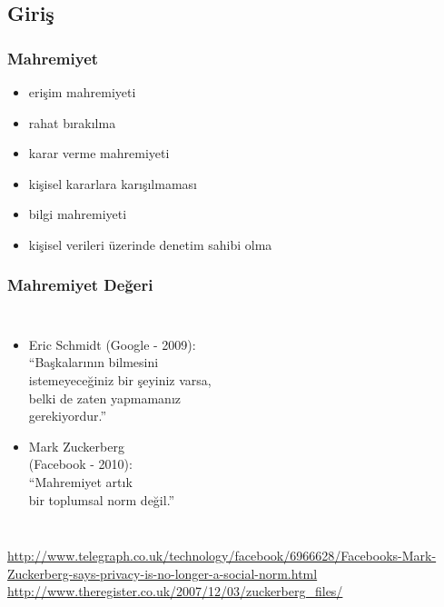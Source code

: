 \documentclass[dvipsnames]{beamer}
\theoremstyle{plain}
\begin{document}
\subsection{Giriş}

\begin{frame}
  \frametitle{Mahremiyet}

  \begin{itemize}
    \item erişim mahremiyeti
    \item rahat bırakılma

    \pause
    \bigskip
    \item karar verme mahremiyeti
    \item kişisel kararlara karışılmaması

    \pause
    \bigskip
    \item bilgi mahremiyeti
    \item kişisel verileri üzerinde denetim sahibi olma
  \end{itemize}
\end{frame}

\begin{frame}
  \frametitle{Mahremiyet Değeri}

  \begin{columns}

    \begin{itemize}
      \item Eric Schmidt (Google - 2009):\\
        \smallskip
        ``Başkalarının bilmesini\\
          istemeyeceğiniz bir şeyiniz varsa,\\
          belki de zaten yapmamanız\\
          gerekiyordur.''

      \pause
      \medskip
      \item Mark Zuckerberg\\
        (Facebook - 2010):\\
        \smallskip
        ``Mahremiyet artık\\
          bir toplumsal norm değil.''
    \end{itemize}
  \end{columns}

  \medskip
  \tiny{\url{http://www.telegraph.co.uk/technology/facebook/6966628/Facebooks-Mark-Zuckerberg-says-privacy-is-no-longer-a-social-norm.html}}\\
  \tiny{\url{http://www.theregister.co.uk/2007/12/03/zuckerberg_files/}}\\
\end{frame}
\end{document}
